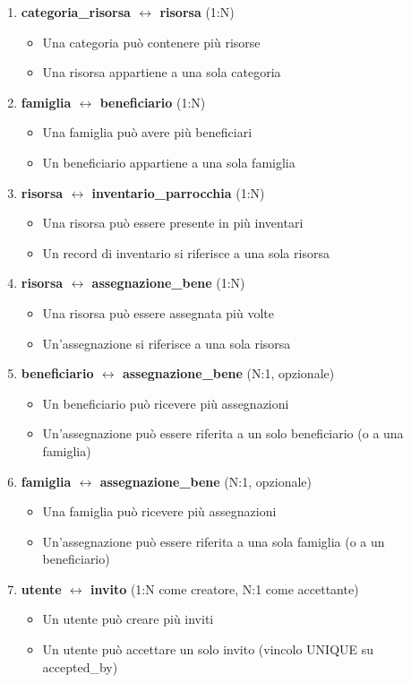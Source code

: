 \documentclass[11pt,a4paper]{article}
\begin{document}
\begin{enumerate}[leftmargin=*]
\item \textbf{categoria\_risorsa $\leftrightarrow$ risorsa} (1:N)
   \begin{itemize}
   \item Una categoria può contenere più risorse
   \item Una risorsa appartiene a una sola categoria
   \end{itemize}

\item \textbf{famiglia $\leftrightarrow$ beneficiario} (1:N)
   \begin{itemize}
   \item Una famiglia può avere più beneficiari
   \item Un beneficiario appartiene a una sola famiglia
   \end{itemize}

\item \textbf{risorsa $\leftrightarrow$ inventario\_parrocchia} (1:N)
   \begin{itemize}
   \item Una risorsa può essere presente in più inventari
   \item Un record di inventario si riferisce a una sola risorsa
   \end{itemize}

\item \textbf{risorsa $\leftrightarrow$ assegnazione\_bene} (1:N)
   \begin{itemize}
   \item Una risorsa può essere assegnata più volte
   \item Un'assegnazione si riferisce a una sola risorsa
   \end{itemize}

\item \textbf{beneficiario $\leftrightarrow$ assegnazione\_bene} (N:1, opzionale)
   \begin{itemize}
   \item Un beneficiario può ricevere più assegnazioni
   \item Un'assegnazione può essere riferita a un solo beneficiario (o a una famiglia)
   \end{itemize}

\item \textbf{famiglia $\leftrightarrow$ assegnazione\_bene} (N:1, opzionale)
   \begin{itemize}
   \item Una famiglia può ricevere più assegnazioni
   \item Un'assegnazione può essere riferita a una sola famiglia (o a un beneficiario)
   \end{itemize}

\item \textbf{utente $\leftrightarrow$ invito} (1:N come creatore, N:1 come accettante)
   \begin{itemize}
   \item Un utente può creare più inviti
   \item Un utente può accettare un solo invito (vincolo UNIQUE su accepted\_by)
   \end{itemize}
\end{enumerate}
\end{document}
